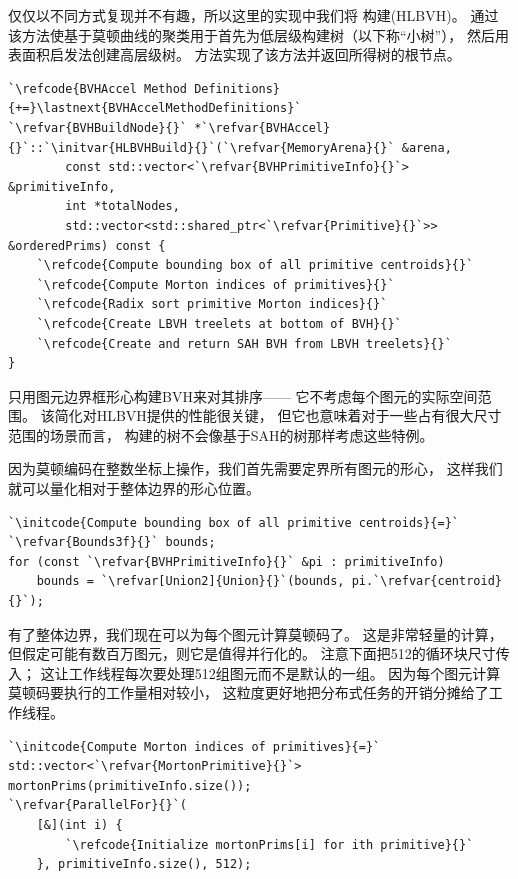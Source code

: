 仅仅以不同方式复现并不有趣，所以这里的实现中我们将
构建(HLBVH)。
通过该方法使基于莫顿曲线的聚类用于首先为低层级构建树（以下称“小树”），
然后用表面积启发法创建高层级树。
方法实现了该方法并返回所得树的根节点。
\begin{lstlisting}
`\refcode{BVHAccel Method Definitions}{+=}\lastnext{BVHAccelMethodDefinitions}`
`\refvar{BVHBuildNode}{}` *`\refvar{BVHAccel}{}`::`\initvar{HLBVHBuild}{}`(`\refvar{MemoryArena}{}` &arena, 
        const std::vector<`\refvar{BVHPrimitiveInfo}{}`> &primitiveInfo,
        int *totalNodes,
        std::vector<std::shared_ptr<`\refvar{Primitive}{}`>> &orderedPrims) const {
    `\refcode{Compute bounding box of all primitive centroids}{}`
    `\refcode{Compute Morton indices of primitives}{}`
    `\refcode{Radix sort primitive Morton indices}{}`
    `\refcode{Create LBVH treelets at bottom of BVH}{}`
    `\refcode{Create and return SAH BVH from LBVH treelets}{}`
}
\end{lstlisting}

只用图元边界框形心构建BVH来对其排序——
它不考虑每个图元的实际空间范围。
该简化对HLBVH提供的性能很关键，
但它也意味着对于一些占有很大尺寸范围的场景而言，
构建的树不会像基于SAH的树那样考虑这些特例。

因为莫顿编码在整数坐标上操作，我们首先需要定界所有图元的形心，
这样我们就可以量化相对于整体边界的形心位置。
\begin{lstlisting}
`\initcode{Compute bounding box of all primitive centroids}{=}`
`\refvar{Bounds3f}{}` bounds;
for (const `\refvar{BVHPrimitiveInfo}{}` &pi : primitiveInfo)
    bounds = `\refvar[Union2]{Union}{}`(bounds, pi.`\refvar{centroid}{}`);
\end{lstlisting}

有了整体边界，我们现在可以为每个图元计算莫顿码了。
这是非常轻量的计算，但假定可能有数百万图元，则它是值得并行化的。
注意下面把512的循环块尺寸传入；
这让工作线程每次要处理512组图元而不是默认的一组。
因为每个图元计算莫顿码要执行的工作量相对较小，
这粒度更好地把分布式任务的开销分摊给了工作线程。
\begin{lstlisting}
`\initcode{Compute Morton indices of primitives}{=}`
std::vector<`\refvar{MortonPrimitive}{}`> mortonPrims(primitiveInfo.size());
`\refvar{ParallelFor}{}`(
    [&](int i) {
        `\refcode{Initialize mortonPrims[i] for ith primitive}{}`
    }, primitiveInfo.size(), 512);
\end{lstlisting}

